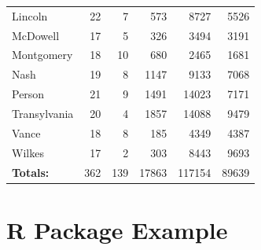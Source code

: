 \documentclass[fleqn]{MJDArticle}
\begin{document}
\begin{table}[ht]
\begin{tabular}{lrrrrr}
Lincoln & 22 & 7 & 573 & 8727 & 5526 \\
\rowcolor{Grey}
McDowell & 17 & 5 & 326 & 3494 & 3191 \\
Montgomery & 18 & 10 & 680 & 2465 & 1681 \\
\rowcolor{Grey}
Nash & 19 & 8 & 1147 & 9133 & 7068 \\
Person & 21 & 9 & 1491 & 14023 & 7171 \\
\rowcolor{Grey}
Transylvania & 20 & 4 & 1857 & 14088 & 9479 \\
Vance & 18 & 8 & 185 & 4349 & 4387 \\
\rowcolor{Grey}
Wilkes & 17 & 2 & 303 & 8443 & 9693 \\
   \hline
   \textbf{Totals:} & 362 & 139 & 17863 & 117154 & 89639 \\
   \hline
\end{tabular}
\end{table}


\section{R Package Example}

 
\hypersetup{linkcolor=black}


 
 
\end{document}
